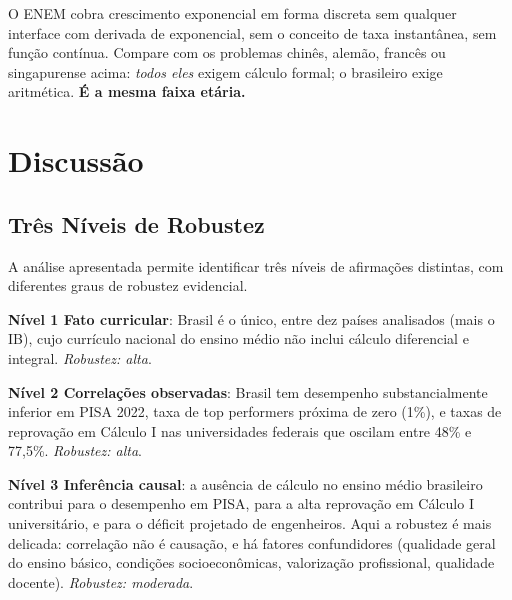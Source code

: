 \documentclass[12pt,a4paper,oneside]{article}
\begin{document}
\smallskip

O ENEM cobra crescimento exponencial em forma discreta \textemdash{}
sem qualquer interface com derivada de exponencial, sem o conceito
de taxa instantânea, sem função contínua. Compare com os problemas
chinês, alemão, francês ou singapurense acima: \emph{todos eles}
exigem cálculo formal; o brasileiro exige aritmética. \textbf{É a
mesma faixa etária.}

\section{Discussão}
\label{sec:discussao}

\subsection{Três Níveis de Robustez}

A análise apresentada permite identificar três níveis de afirmações
distintas, com diferentes graus de robustez evidencial.

\textbf{Nível 1 \textemdash{} Fato curricular}: Brasil é o único,
entre dez países analisados (mais o IB), cujo currículo nacional do
ensino médio não inclui cálculo diferencial e integral. \emph{Robustez:
alta}.

\textbf{Nível 2 \textemdash{} Correlações observadas}: Brasil tem
desempenho substancialmente inferior em PISA 2022, taxa de top
performers próxima de zero (1\%), e taxas de reprovação em Cálculo
I nas universidades federais que oscilam entre 48\% e 77,5\%.
\emph{Robustez: alta}.

\textbf{Nível 3 \textemdash{} Inferência causal}: a ausência de
cálculo no ensino médio brasileiro contribui para o desempenho em
PISA, para a alta reprovação em Cálculo I universitário, e para o
déficit projetado de engenheiros. Aqui a robustez é mais delicada:
correlação não é causação, e há fatores confundidores (qualidade
geral do ensino básico, condições socioeconômicas, valorização
profissional, qualidade docente). \emph{Robustez: moderada}.
\end{document}
